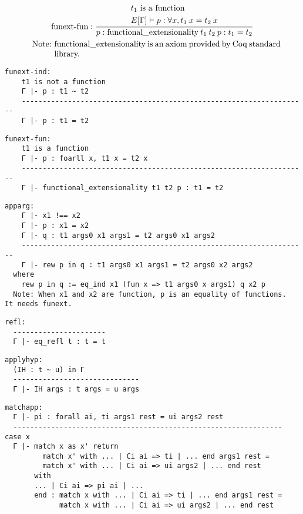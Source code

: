 \documentclass[a4paper,fleqn]{article}
\def\coq{\textrm{Coq}}
\begin{document}
\begin{gather*}
  \text{funext-fun}:
    \dfrac{
      \begin{aligned}
        & \mbox{$t_1$ is a function} \\
        & E[\Gamma] \vdash p : \forall x, t_1\:x = t_2\:x\\
      \end{aligned}
    }{
      p : \mbox{functional\_extensionality}\:t_1\:t_2\:p : t_1 = t_2
    } \\
    \quad \mbox{Note:}~
      \begin{minipage}[t]{0.8\columnwidth}
        functional\_extensionality is an axiom provided by \coq{} standard library.
      \end{minipage}
\end{gather*}

\begin{verbatim}
funext-ind:
    t1 is not a function
    Γ |- p : t1 ~ t2
    --------------------------------------------------------------------
    Γ |- p : t1 = t2
\end{verbatim}

\begin{verbatim}
funext-fun:
    t1 is a function
    Γ |- p : foarll x, t1 x = t2 x
    --------------------------------------------------------------------
    Γ |- functional_extensionality t1 t2 p : t1 = t2
\end{verbatim}

\begin{verbatim}
apparg:
    Γ |- x1 !== x2
    Γ |- p : x1 = x2
    Γ |- q : t1 args0 x1 args1 = t2 args0 x1 args2
    --------------------------------------------------------------------
    Γ |- rew p in q : t1 args0 x1 args1 = t2 args0 x2 args2
  where
    rew p in q := eq_ind x1 (fun x => t1 args0 x args1) q x2 p
  Note: When x1 and x2 are function, p is an equality of functions.  It needs funext.
\end{verbatim}

\begin{verbatim}
refl:
  ----------------------
  Γ |- eq_refl t : t = t
\end{verbatim}

\begin{verbatim}
applyhyp:
  (IH : t ~ u) in Γ
  ------------------------------
  Γ |- IH args : t args = u args
\end{verbatim}

\begin{verbatim}
matchapp:
  Γ |- pi : forall ai, ti args1 rest = ui args2 rest
  ---------------------------------------------------------------- case x
  Γ |- match x as x' return
         match x' with ... | Ci ai => ti | ... end args1 rest =
         match x' with ... | Ci ai => ui args2 | ... end rest
       with
       ... | Ci ai => pi ai | ...
       end : match x with ... | Ci ai => ti | ... end args1 rest =
             match x with ... | Ci ai => ui args2 | ... end rest
\end{verbatim}
\end{document}
